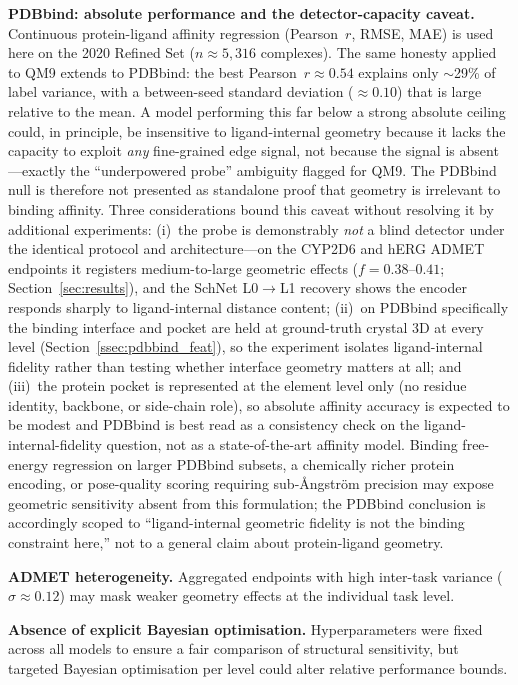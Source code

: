 \documentclass[pdflatex,sn-vancouver-num]{sn-jnl}%
\theoremstyle{thmstyleone}%
\theoremstyle{thmstyletwo}%
\theoremstyle{thmstylethree}%
\begin{document}
\textbf{PDBbind: absolute performance and the detector-capacity caveat.}  Continuous protein-ligand affinity regression (Pearson~$r$, RMSE, MAE) is used here on the 2020 Refined Set ($n \approx 5{,}316$ complexes).  The same honesty applied to QM9 extends to PDBbind: the best Pearson~$r \approx 0.54$ explains only $\sim$29\% of label variance, with a between-seed standard deviation ($\approx 0.10$) that is large relative to the mean.  A model performing this far below a strong absolute ceiling could, in principle, be insensitive to ligand-internal geometry because it lacks the capacity to exploit \emph{any} fine-grained edge signal, not because the signal is absent---exactly the ``underpowered probe'' ambiguity flagged for QM9.  The PDBbind null is therefore not presented as standalone proof that geometry is irrelevant to binding affinity.  Three considerations bound this caveat without resolving it by additional experiments: (i)~the probe is demonstrably \emph{not} a blind detector under the identical protocol and architecture---on the CYP2D6 and hERG ADMET endpoints it registers medium-to-large geometric effects ($f = 0.38$--$0.41$; Section~\ref{sec:results}), and the SchNet L0$\to$L1 recovery shows the encoder responds sharply to ligand-internal distance content; (ii)~on PDBbind specifically the binding interface and pocket are held at ground-truth crystal 3D at every level (Section~\ref{ssec:pdbbind_feat}), so the experiment isolates ligand-internal fidelity rather than testing whether interface geometry matters at all; and (iii)~the protein pocket is represented at the element level only (no residue identity, backbone, or side-chain role), so absolute affinity accuracy is expected to be modest and PDBbind is best read as a consistency check on the ligand-internal-fidelity question, not as a state-of-the-art affinity model.  Binding free-energy regression on larger PDBbind subsets, a chemically richer protein encoding, or pose-quality scoring requiring sub-\AA{}ngstr\"{o}m precision may expose geometric sensitivity absent from this formulation; the PDBbind conclusion is accordingly scoped to ``ligand-internal geometric fidelity is not the binding constraint here,'' not to a general claim about protein-ligand geometry.

\textbf{ADMET heterogeneity.}  Aggregated endpoints with high inter-task
variance ($\sigma \approx 0.12$) may mask weaker geometry effects at the
individual task level.

\textbf{Absence of explicit Bayesian optimisation.} Hyperparameters were fixed across all models to ensure a fair comparison of structural sensitivity, but targeted Bayesian optimisation per level could alter relative performance bounds.
\end{document}
